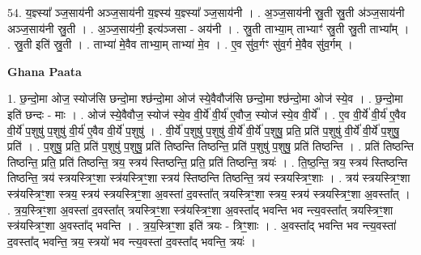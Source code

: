 \documentclass[17pt]{extarticle}
\begin{document}
54. य॒ज्ञ्स्या᳚ ञ्ज॒साय॑नी अञ्ज॒साय॑नी य॒ज्ञ्स्य॑ य॒ज्ञ्स्या᳚ ञ्ज॒साय॑नी । . अ॒ञ्ज॒साय॑नी स्रु॒ती स्रु॒ती अ॑ञ्ज॒साय॑नी अञ्ज॒साय॑नी स्रु॒ती । . अ॒ञ्ज॒साय॑नी॒ इत्य॑ञ्जसा - अय॑नी । . स्रु॒ती ताभ्या॒म् ताभ्याꣳ॑ स्रु॒ती स्रु॒ती ताभ्या᳚म् । . स्रु॒ती इति॑ स्रु॒ती । . ताभ्या॑ मे॒वैव ताभ्या॒म् ताभ्या॑ मे॒व । . ए॒व सु॑व॒र्गꣳ सु॑व॒र्ग मे॒वैव सु॑व॒र्गम् । \newline

\textbf{Ghana Paata } \newline

1. छ॒न्दो॒मा ओज॒ स्योज॑सि छन्दो॒मा श्छ॑न्दो॒मा ओज॑ स्ये॒वैवौज॑सि छन्दो॒मा श्छ॑न्दो॒मा ओज॑ स्ये॒व । . छ॒न्दो॒मा इति॑ छन्दः - माः । . ओज॑ स्ये॒वैवौज॒ स्योज॑ स्ये॒व वी॒र्ये॑ वी॒र्य॑ ए॒वौज॒ स्योज॑ स्ये॒व वी॒र्ये᳚ । . ए॒व वी॒र्ये॑ वी॒र्य॑ ए॒वैव वी॒र्ये॑ प॒शुषु॑ प॒शुषु॑ वी॒र्य॑ ए॒वैव वी॒र्ये॑ प॒शुषु॑ । . वी॒र्ये॑ प॒शुषु॑ प॒शुषु॑ वी॒र्ये॑ वी॒र्ये॑ प॒शुषु॒ प्रति॒ प्रति॑ प॒शुषु॑ वी॒र्ये॑ वी॒र्ये॑ प॒शुषु॒ प्रति॑ । . प॒शुषु॒ प्रति॒ प्रति॑ प॒शुषु॑ प॒शुषु॒ प्रति॑ तिष्ठन्ति तिष्ठन्ति॒ प्रति॑ प॒शुषु॑ प॒शुषु॒ प्रति॑ तिष्ठन्ति । . प्रति॑ तिष्ठन्ति तिष्ठन्ति॒ प्रति॒ प्रति॑ तिष्ठन्ति॒ त्रय॒ स्त्रय॑ स्तिष्ठन्ति॒ प्रति॒ प्रति॑ तिष्ठन्ति॒ त्रयः॑ । . ति॒ष्ठ॒न्ति॒ त्रय॒ स्त्रय॑ स्तिष्ठन्ति तिष्ठन्ति॒ त्रय॑ स्त्रयस्त्रिꣳ॒॒शा स्त्र॑यस्त्रिꣳ॒॒शा स्त्रय॑ स्तिष्ठन्ति तिष्ठन्ति॒ त्रय॑ स्त्रयस्त्रिꣳ॒॒शाः । . त्रय॑ स्त्रयस्त्रिꣳ॒॒शा स्त्र॑यस्त्रिꣳ॒॒शा स्त्रय॒ स्त्रय॑ स्त्रयस्त्रिꣳ॒॒शा अ॒वस्ता॑ द॒वस्ता᳚त् त्रयस्त्रिꣳ॒॒शा स्त्रय॒ स्त्रय॑ स्त्रयस्त्रिꣳ॒॒शा अ॒वस्ता᳚त् । . त्र॒य॒स्त्रिꣳ॒॒शा अ॒वस्ता॑ द॒वस्ता᳚त् त्रयस्त्रिꣳ॒॒शा स्त्र॑यस्त्रिꣳ॒॒शा अ॒वस्ता᳚द् भवन्ति भव न्त्य॒वस्ता᳚त् त्रयस्त्रिꣳ॒॒शा स्त्र॑यस्त्रिꣳ॒॒शा अ॒वस्ता᳚द् भवन्ति । . त्र॒य॒स्त्रिꣳ॒॒शा इति॑ त्रयः - त्रिꣳ॒॒शाः । . अ॒वस्ता᳚द् भवन्ति भव न्त्य॒वस्ता॑ द॒वस्ता᳚द् भवन्ति॒ त्रय॒ स्त्रयो॑ भव न्त्य॒वस्ता॑ द॒वस्ता᳚द् भवन्ति॒ त्रयः॑ । \newline
\end{document}
